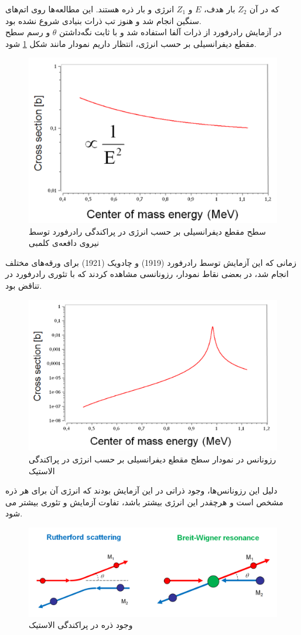 \documentclass[12pt,a4paper]{article}
\begin{document}
	که در آن $Z_2$ بار هدف، $E$ و $Z_1$ انرژی و بار ذره هستند. این مطالعه‌ها روی اتم‌های سنگین انجام شد و هنوز تب ذرات بنیادی شروع نشده بود.\\
	در آزمایش رادرفورد از ذرات آلفا استفاده شد و با ثابت نگه‌داشتن $\theta$ و رسم سطح مقطع دیفرانسیلی بر حسب انرژی، انتظار داریم نمودار مانند شکل
	\ref{fig:diffcross} شود.
	
	\begin{figure}[h]
		\centering
		\includegraphics[width=0.65\linewidth]{captures/Capture.png}
		\caption{سطح مقطع دیفرانسیلی بر حسب انرژی در پراکندگی رادرفورد توسط نیروی دافعه‌ی کلمبی}
		\label{fig:diffcross}
	\end{figure}
	زمانی که این آزمایش توسط رادرفورد (1919) و چادویک (1921) برای ورقه‌های مختلف انجام شد، در بعضی نقاط نمودار، رزونانسی مشاهده کردند که با تئوری رادرفورد در تناقض بود.
	\begin{figure}[h]
		\centering
		\includegraphics[width=0.65\linewidth]{captures/Capture1.png}
		\caption{رزونانس در نمودار سطح مقطع دیفرانسیلی بر حسب انرژی در پراکندگی الاستیک}
		\label{fig:reso}
	\end{figure}
	
	دلیل این رزونانس‌ها، وجود ذراتی در این آزمایش بودند که انرژی آن برای هر ذره مشخص است و هرچقدر این انرژی بیشتر باشد، تفاوت آزمایش و تئوری بیشتر می شود.
	\begin{figure}[h]
		\centering
		\includegraphics[width=\linewidth]{captures/Capture2.png}
		\caption{وجود ذره در پراکندگی الاستیک}
	\end{figure}
	
\end{document}
